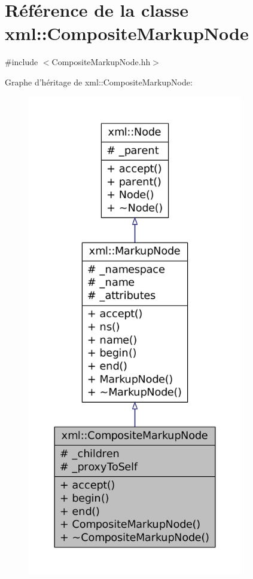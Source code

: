 \hypertarget{classxml_1_1_composite_markup_node}{
\section{Référence de la classe xml::CompositeMarkupNode}
\label{classxml_1_1_composite_markup_node}
}


{\ttfamily \#include $<$CompositeMarkupNode.hh$>$}



Graphe d'héritage de xml::CompositeMarkupNode:
\nopagebreak
\begin{figure}[H]
\begin{center}
\leavevmode
\includegraphics[height=600pt]{classxml_1_1_composite_markup_node__inherit__graph}
\end{center}
\end{figure}


